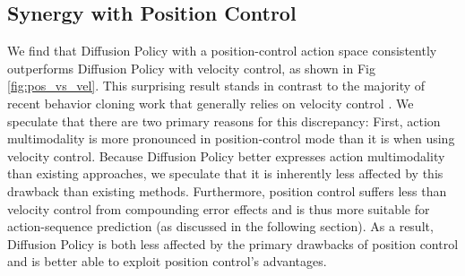 \subsection{Synergy with Position Control} 
\label{sec:property_pos_vs_vel}
We find that Diffusion Policy with a position-control action space consistently outperforms Diffusion Policy with velocity control, as shown in Fig \ref{fig:pos_vs_vel}. This surprising result stands in contrast to the majority of recent behavior cloning work that generally relies on velocity control \cite{robomimic, bet, zhang2018deep, florence2019self, mandlekar2020learning, mandlekar2020iris}. We speculate that there are two primary reasons for this discrepancy: First, action multimodality is more pronounced in position-control mode than it is when using velocity control. Because Diffusion Policy better expresses action multimodality than existing approaches, we speculate that it is inherently less affected by this drawback than existing methods. Furthermore, position control suffers less than velocity control from compounding error effects and is thus more suitable for action-sequence prediction (as discussed in the following section). As a result, Diffusion Policy is both less affected by the primary drawbacks of position control and is better able to exploit position control's advantages.
 




